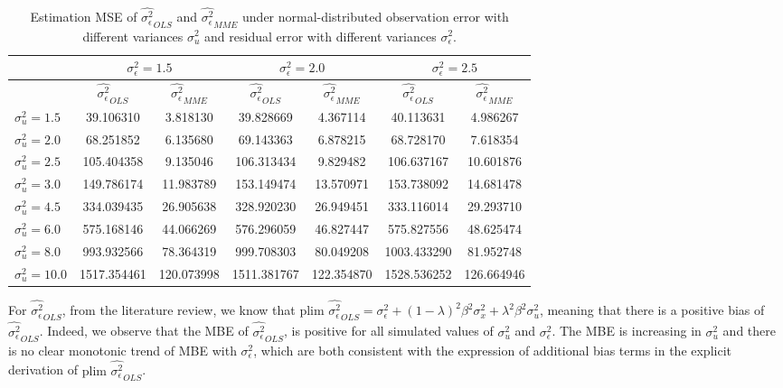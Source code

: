 \documentclass{article}
\begin{document}
\begin{table}[ht]
    \centering
    \caption{Estimation MSE of $\hat{\sigma^2_\epsilon}_{OLS}$ and $\hat{\sigma^2_\epsilon}_{MME}$ under normal-distributed observation error with different variances $\sigma^2_u$ and residual error with different variances $\sigma^2_\epsilon$.}
    \label{Tab:MSE_sigma_normal}
    \begin{tabular}[t]{lcccccc}
        \hline
        &\multicolumn{2}{c}{$\sigma^2_\epsilon=1.5$}&\multicolumn{2}{c}{$\sigma^2_\epsilon=2.0$}&\multicolumn{2}{c}{$\sigma^2_\epsilon=2.5$}\\
        \hline
        &$\hat{\sigma^2_\epsilon}_{OLS}$&$\hat{\sigma^2_\epsilon}_{MME}$&$\hat{\sigma^2_\epsilon}_{OLS}$&
        $\hat{\sigma^2_\epsilon}_{MME}$&$\hat{\sigma^2_\epsilon}_{OLS}$&$\hat{\sigma^2_\epsilon}_{MME}$\\ 
        \hline
        $\sigma^2_u = 1.5$&39.106310&3.818130&39.828669&4.367114&40.113631&4.986267\\
        $\sigma^2_u = 2.0$&68.251852&6.135680&69.143363&6.878215&68.728170&7.618354\\
        $\sigma^2_u = 2.5$&105.404358&9.135046&106.313434&9.829482&106.637167&10.601876\\
        $\sigma^2_u = 3.0$&149.786174&11.983789&153.149474&13.570971&153.738092&14.681478\\
        $\sigma^2_u = 4.5$&334.039435&26.905638&328.920230&26.949451&333.116014&29.293710\\
        $\sigma^2_u = 6.0$&575.168146&44.066269&576.296059&46.827447&575.827556&48.625474\\
        $\sigma^2_u = 8.0$&993.932566&78.364319&999.708303&80.049208&1003.433290&81.952748\\
        $\sigma^2_u = 10.0$&1517.354461&120.073998&1511.381767&122.354870&1528.536252&126.664946\\
        \hline
    \end{tabular}
\end{table}

For $\hat{\sigma^2_\epsilon}_{OLS}$, from the literature review, we know that $\textrm{plim } \hat{\sigma^2_\epsilon}_{OLS} = \sigma_\epsilon^2 + (1-\lambda)^2 \beta^2 \sigma_x^2 + \lambda^2 \beta^2 \sigma_u^2$, meaning that there is a positive bias of $\hat{\sigma^2_\epsilon}_{OLS}$. 
Indeed, we observe that the MBE of $\hat{\sigma^2_\epsilon}_{OLS}$, is positive for all simulated values of $\sigma^2_u$ and $\sigma^2_\epsilon$.
The MBE is increasing in $\sigma^2_u$ and there is no clear monotonic trend of MBE with $\sigma^2_\epsilon$, which are both consistent with the expression of additional bias terms in the explicit derivation of $\textrm{plim } \hat{\sigma^2_\epsilon}_{OLS}$.
\end{document}
